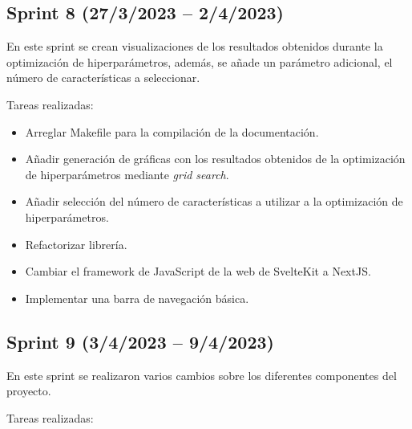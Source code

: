 \subsection{Sprint 8 (27/3/2023 -- 2/4/2023)}

En este sprint se crean visualizaciones de los resultados obtenidos durante la
optimización de hiperparámetros, además, se añade un parámetro adicional, el
número de características a seleccionar.

Tareas realizadas:

\begin{itemize}
    \item Arreglar Makefile para la compilación de la documentación.
    \item Añadir generación de gráficas con los resultados obtenidos de la
    optimización de hiperparámetros mediante \textit{grid search}.
    \item Añadir selección del número de características a utilizar a la
          optimización de hiperparámetros.
    \item Refactorizar librería.
    \item Cambiar el framework de JavaScript de la web de SvelteKit a NextJS.
    \item Implementar una barra de navegación básica.
\end{itemize}

\subsection{Sprint 9 (3/4/2023 -- 9/4/2023)}

En este sprint se realizaron varios cambios sobre los diferentes componentes del
proyecto.

Tareas realizadas:

